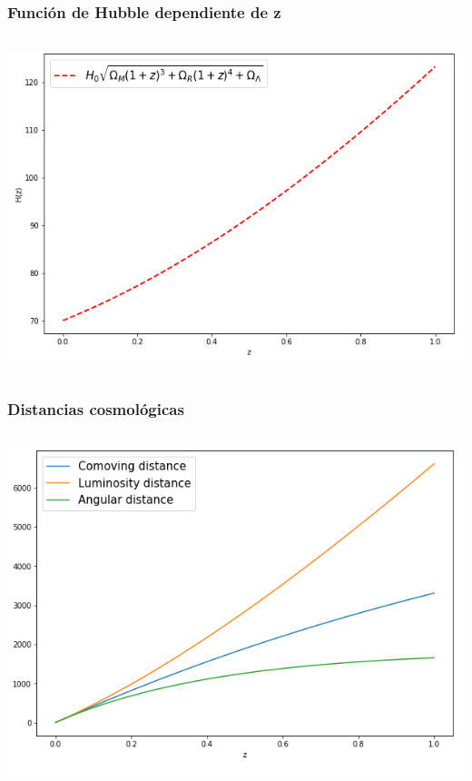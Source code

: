 \documentclass{beamer}
\begin{document}
\begin{frame}
\frametitle{Función de Hubble dependiente de z}
\begin{columns}
	\begin{column}{10cm}
		\includegraphics[width=\columnwidth]{8.png} 
\end{column}
\end{columns}
\end{frame}


\begin{frame}
    \frametitle{Distancias cosmológicas} 
\begin{columns}
	\begin{column}{10cm}
\includegraphics[width=\columnwidth]{discosm0.png} 
\end{column}
\end{columns}
\end{frame}
\end{document}
